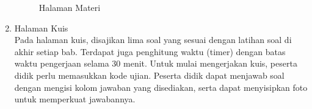 \documentclass[12pt]{article}
\begin{document}
\begin{enumerate}
\begin{figure}[H]
        \caption{Halaman Materi}
        \label{fig:materi}
    \end{figure}

    \item Halaman Kuis\\
    \hspace*{1cm}Pada halaman kuis, disajikan lima soal yang sesuai dengan latihan soal di akhir setiap bab. Terdapat juga penghitung waktu (timer) dengan batas waktu pengerjaan selama 30 menit. Untuk mulai mengerjakan kuis, peserta didik perlu memasukkan kode ujian. Peserta didik dapat menjawab soal dengan mengisi kolom jawaban yang disediakan, serta dapat menyisipkan foto untuk memperkuat jawabannya.

\end{enumerate}
\end{document}
